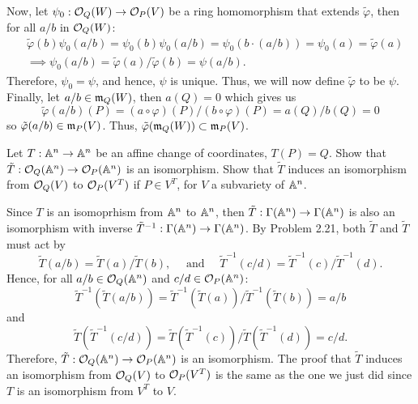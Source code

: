 \begin{solution}
    Now, let $\psi_0 : \mathcal{O}_Q(W)\to \mathcal{O}_P(V)$ be a ring homomorphism that extends $\tilde{\varphi}$, then for all $a/b$ in $\mathcal{O}_Q(W)$:
    \begin{align*}
        & \tilde{\varphi}(b)\psi_0(a/b) = \psi_0(b)\psi_0(a/b) = \psi_0(b\cdot (a/b)) = \psi_0(a) = \tilde{\varphi}(a)\\
        &\implies \psi_0(a/b) = \tilde{\varphi}(a)/\tilde{\varphi}(b) = \psi(a/b).
    \end{align*}
    Therefore, $\psi_0 = \psi$, and hence, $\psi$ is unique. Thus, we will now define $\tilde{\varphi}$ to be $\psi$.\\

    Finally, let $a/b \in \mathfrak{m}_Q(W)$, then $a(Q) = 0$ which gives us
    $$\tilde{\varphi}(a/b)(P) = (a\circ \varphi)(P)/(b\circ \varphi)(P) = a(Q)/b(Q) = 0$$
    so $\tilde{\varphi}(a/b) \in \mathfrak{m}_P(V)$. Thus, $\tilde{\varphi}(\mathfrak{m}_Q(W)) \subset \mathfrak{m}_P(V)$. \\
\end{solution}

\begin{exercise}
    Let $T : \mathbb{A}^n \to \mathbb{A}^n$ be an affine change of coordinates, $T(P) = Q$. Show that $\tilde{T} : \mathcal{O}_Q(\mathbb{A}^n) \to \mathcal{O}_P(\mathbb{A}^n)$ is an isomorphism. Show that $\tilde{T}$ induces an isomorphism from $\mathcal{O}_Q(V)$ to $\mathcal{O}_P(V^T)$ if $P \in V^T$, for $V$ a subvariety of $\mathbb{A}^n$. \\
\end{exercise}

\begin{solution}
    Since $T$ is an isomoprhism from $\mathbb{A}^n$ to $\mathbb{A}^n$, then $\tilde{T} : \Gamma(\mathbb{A}^n) \to \Gamma(\mathbb{A}^n)$ is also an isomorphism with inverse $\tilde{T}^{-1} : \Gamma(\mathbb{A}^n) \to \Gamma(\mathbb{A}^n)$. By Problem 2.21, both $\tilde{T}$ and $\tilde{T}$ must act by
    $$\tilde{T}(a/b) = \tilde{T}(a)/\tilde{T}(b), \quad \text{ and } \quad \tilde{T}^{-1}(c/d) = \tilde{T}^{-1}(c)/\tilde{T}^{-1}(d).$$
    Hence, for all $a/b \in \mathcal{O}_Q(\mathbb{A}^n)$ and $c/d \in \mathcal{O}_P(\mathbb{A}^n)$:
    $$\tilde{T}^{-1}(\tilde{T}(a/b)) = \tilde{T}^{-1}(\tilde{T}(a))/\tilde{T}^{-1}(\tilde{T}(b)) = a/b$$
    and 
    $$\tilde{T}(\tilde{T}^{-1}(c/d)) = \tilde{T}(\tilde{T}^{-1}(c))/\tilde{T}(\tilde{T}^{-1}(d)) = c/d.$$
    Therefore, $\tilde{T} : \mathcal{O}_Q(\mathbb{A}^n) \to \mathcal{O}_P(\mathbb{A}^n)$ is an isomorphism. The proof that $\tilde{T}$ induces an isomorphism from $\mathcal{O}_Q(V)$ to $\mathcal{O}_P(V^T)$ is the same as the one we just did since $T$ is an isomorphism from $V^T$ to $V$. \\
\end{solution}